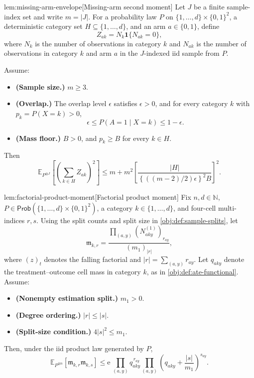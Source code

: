 \begin{lemmav}{lem:missing-arm-envelope}[Missing-arm second moment]
Let \(J\) be a finite sample-index set and write \(m=|J|\). For a probability law \(P\) on \(\{1,\ldots,d\}\times\{0,1\}^2\), a deterministic category set \(H\subseteq\{1,\ldots,d\}\), and an arm \(a\in\{0,1\}\), define
\[
Z_{ak}=N_k\mathbf 1\{N_{ak}=0\},
\]
where \(N_k\) is the number of observations in category \(k\) and \(N_{ak}\) is the number of observations in category \(k\) and arm \(a\) in the \(J\)-indexed iid sample from \(P\).

Assume:
\begin{itemize}
\item \textbf{(Sample size.)} \(m\ge 3\).
\item \textbf{(Overlap.)} The overlap level \(\epsilon\) satisfies \(\epsilon>0\), and for every category \(k\) with \(p_k=P(X=k)>0\),
\[
\epsilon\le P(A=1\mid X=k)\le 1-\epsilon .
\]
\item \textbf{(Mass floor.)} \(B>0\), and \(p_k\ge B\) for every \(k\in H\).
\end{itemize}
Then
\[
\mathbb E_{P^{\otimes J}}\left[
\left(\sum_{k\in H} Z_{ak}\right)^2
\right]
\le
m+m^2
\left[
\frac{|H|}
{\left\{\left((m-2)/2\right)\epsilon\right\}^2 B}
\right]^2 .
\]
\end{lemmav}

\begin{lemmav}{lem:factorial-product-moment}[Factorial product moment]
Fix \(n,d\in\mathbb N\), \(P\in\mathsf{Prob}(\{1,\ldots,d\}\times\{0,1\}^2)\), a category \(k\in\{1,\ldots,d\}\), and four-cell multi-indices \(r,s\). Using the split counts and split size in \cref{obj:def:sample-splits}, let
\[
\mathfrak m_{k,r}
=
\frac{\prod_{(a,y)}(N^{(1)}_{aky})_{r_{ay}}}{(m_1)_{|r|}},
\]
where \((z)_t\) denotes the falling factorial and \(|r|=\sum_{(a,y)}r_{ay}\). Let \(q_{aky}\) denote the treatment--outcome cell mass in category \(k\), as in \cref{obj:def:ate-functional}. Assume:
\begin{itemize}
\item \textbf{(Nonempty estimation split.)} \(m_1>0\).
\item \textbf{(Degree ordering.)} \(|r|\le |s|\).
\item \textbf{(Split-size condition.)} \(4|s|^2\le m_1\).
\end{itemize}
Then, under the iid product law generated by \(P\),
\[
\mathbb E_{P^{\otimes n}}\!\left[\mathfrak m_{k,r}\mathfrak m_{k,s}\right]
\le \mathrm e\,\prod_{(a,y)}q_{aky}^{\,r_{ay}}
\prod_{(a,y)}
\left(q_{aky}+\frac{|s|}{m_1}\right)^{s_{ay}} .
\]
\end{lemmav}

